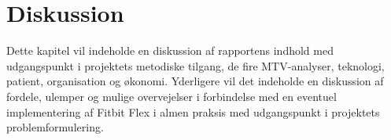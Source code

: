 \chapter{Diskussion}
Dette kapitel vil indeholde en diskussion af rapportens indhold med udgangspunkt i projektets metodiske tilgang, de fire MTV-analyser, teknologi, patient, organisation og økonomi. Yderligere vil det indeholde en diskussion af fordele, ulemper og mulige overvejelser i forbindelse med en eventuel implementering af Fitbit Flex i almen praksis med udgangspunkt i projektets problemformulering.






